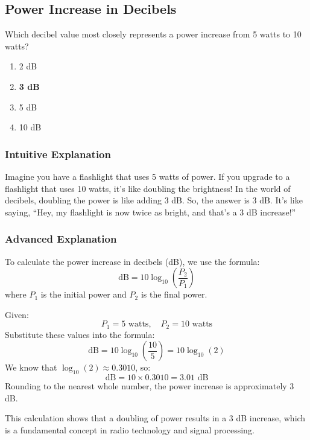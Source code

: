 \subsection{Power Increase in Decibels}
\label{T5B09}

\begin{tcolorbox}[colback=gray!10!white,colframe=black!75!black,title=T5B09]
Which decibel value most closely represents a power increase from 5 watts to 10 watts?
\begin{enumerate}[label=\Alph*)]
    \item 2 dB
    \item \textbf{3 dB}
    \item 5 dB
    \item 10 dB
\end{enumerate}
\end{tcolorbox}

\subsubsection{Intuitive Explanation}
Imagine you have a flashlight that uses 5 watts of power. If you upgrade to a flashlight that uses 10 watts, it’s like doubling the brightness! In the world of decibels, doubling the power is like adding 3 dB. So, the answer is 3 dB. It’s like saying, “Hey, my flashlight is now twice as bright, and that’s a 3 dB increase!”

\subsubsection{Advanced Explanation}
To calculate the power increase in decibels (dB), we use the formula:
\[
\text{dB} = 10 \log_{10}\left(\frac{P_2}{P_1}\right)
\]
where \(P_1\) is the initial power and \(P_2\) is the final power. 

Given:
\[
P_1 = 5 \text{ watts}, \quad P_2 = 10 \text{ watts}
\]
Substitute these values into the formula:
\[
\text{dB} = 10 \log_{10}\left(\frac{10}{5}\right) = 10 \log_{10}(2)
\]
We know that \(\log_{10}(2) \approx 0.3010\), so:
\[
\text{dB} = 10 \times 0.3010 = 3.01 \text{ dB}
\]
Rounding to the nearest whole number, the power increase is approximately 3 dB.

This calculation shows that a doubling of power results in a 3 dB increase, which is a fundamental concept in radio technology and signal processing.


